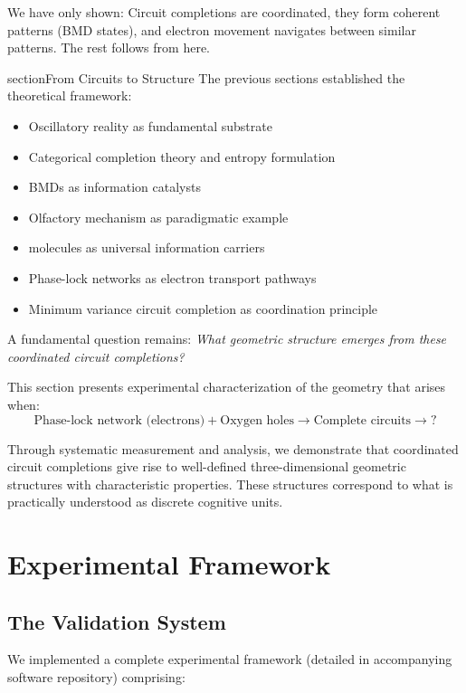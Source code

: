 \documentclass[12pt,a4paper]{article}
\begin{document}
We have only shown: Circuit completions are coordinated, they form coherent patterns (BMD states), and electron movement navigates between similar patterns. The rest follows from here.

section{From Circuits to Structure}
The previous sections established the theoretical framework:
\begin{itemize}
\item Oscillatory reality as fundamental substrate
\item Categorical completion theory and entropy formulation
\item BMDs as information catalysts
\item Olfactory mechanism as paradigmatic example
\item {} molecules as universal information carriers
\item Phase-lock networks as electron transport pathways
\item Minimum variance circuit completion as coordination principle
\end{itemize}

A fundamental question remains: \textit{What geometric structure emerges from these coordinated circuit completions?}

This section presents experimental characterization of the geometry that arises when:
\begin{equation}
\text{Phase-lock network (electrons)} + \text{Oxygen holes} \to \text{Complete circuits} \to \text{?}
\end{equation}

Through systematic measurement and analysis, we demonstrate that coordinated circuit completions give rise to well-defined three-dimensional geometric structures with characteristic properties. These structures correspond to what is practically understood as discrete cognitive units.

\section{Experimental Framework}

\subsection{The Validation System}

We implemented a complete experimental framework (detailed in accompanying software repository) comprising:
\end{document}
